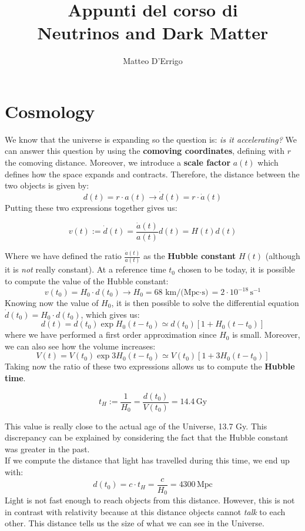 \documentclass[10.75pt,a4paper,openright,bottom=2cm]{article}
\title{\textbf{Appunti del corso di}\\\textbf{Neutrinos and Dark Matter}}
\author{Matteo D'Errigo}
\newcommand{\beginbox}[1]{\begin{tcolorbox}[width=\textwidth,colback={black!40},title={#1},colbacktitle={purple!55},coltitle=black]}
\renewcommand{\endbox}{\end{tcolorbox}\noindent}
\begin{document}
\maketitle
\tableofcontents
\newpage
\section{Cosmology}
We know that the universe is expanding so the question is: \textit{is it accelerating?} We can answer this question by using the \textbf{comoving coordinates}, defining with $r$ the comoving distance. Moreover, we introduce a \textbf{scale factor} $a(t)$ which defines how the space expands and contracts. Therefore, the distance between the two objects is given by:
\[
d(t)=r\cdot a(t)\to\Dot{d}(t)=r\cdot\Dot{a}(t)
\]
Putting these two expressions together gives us:
\beginbox{Hubble Constant}
\[
v(t):=\Dot{d}(t)=\frac{\Dot{a}(t)}{a(t)}d(t)=H(t)d(t)
\]
\endbox
Where we have defined the ratio $\frac{\Dot{a}(t)}{a(t)}$ as the \textbf{Hubble constant} $H(t)$ (although it is \textit{not} really constant). At a reference time $t_0$ chosen to be today, it is possible to compute the value of the Hubble constant:
\[
v(t_0)=H_0\cdot d(t_0)\to H_0=68\,\text{km/(Mpc$\cdot$s)}=2\cdot10^{-18}\,\text{s$^{-1}$}
\]
Knowing now the value of $H_0$, it is then possible to solve the differential equation\\
$\Dot{d}(t_0)=H_0\cdot d(t_0)$, which gives us:
\[
d(t)=d(t_0)\exp{H_0(t-t_0)}\simeq d(t_0)[1+H_0(t-t_0)]
\]
where we have performed a first order approximation since $H_0$ is small. Moreover, we can also see how the volume increases:
\[
V(t)=V(t_0)\exp{3H_0(t-t_0)}\simeq V(t_0)[1+3H_0(t-t_0)]
\]
Taking now the ratio of these two expressions allows us to compute the \textbf{Hubble time}.
\beginbox{Hubble Time}
\[
t_H:=\frac{1}{H_0}=\frac{d(t_0)}{V(t_0)}=14.4\,\text{Gy}
\]
\endbox
This value is really close to the actual age of the Universe, 13.7 Gy. This discrepancy can be explained by considering the fact that the Hubble constant was greater in the past.\\
If we compute the distance that light has travelled during this time, we end up with:
\[
d(t_0)=c\cdot t_H=\frac{c}{H_0}=4300\,\text{Mpc}
\]
Light is not fast enough to reach objects from this distance. However, this is not in contrast with relativity because at this distance objects cannot \textit{talk} to each other. This distance tells us the size of what we can see in the Universe.\\
\end{document}
